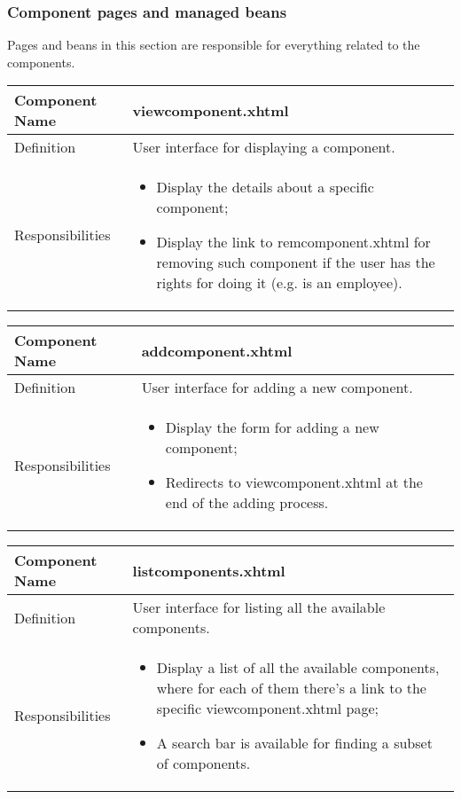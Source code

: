 \documentclass[a4paper,12pt]{book}
\begin{document}
\subsubsection{Component pages and managed beans}
Pages and beans in this section are responsible for everything related to the components.

\begin{center}
  \begin{tabular}{ | p{3.3cm} | p{11.7cm} | }
    \hline
    Component Name & \textbf{viewcomponent.xhtml} \\ \hline
    Definition & User interface for displaying a component. \\ \hline
    Responsibilities & \parbox{0.65\textwidth}{
      \begin{itemize}[noitemsep,leftmargin=*]
        \item Display the details about a specific component;
        \item Display the link to remcomponent.xhtml for removing such component if the user has the rights for doing it (e.g. is an employee).
      \end{itemize}} \\ \hline
    \end{tabular}
  \end{center}
\begin{center}
  \begin{tabular}{ | p{3.3cm} | p{11.7cm} | }
    \hline
    Component Name & \textbf{addcomponent.xhtml} \\ \hline
    Definition & User interface for adding a new component. \\ \hline
    Responsibilities & \parbox{0.65\textwidth}{
      \begin{itemize}[noitemsep,leftmargin=*]
        \item Display the form for adding a new component;
        \item Redirects to viewcomponent.xhtml at the end of the adding process.
      \end{itemize}} \\ \hline
    \end{tabular}
  \end{center}
\begin{center}
  \begin{tabular}{ | p{3.3cm} | p{11.7cm} | }
    \hline
    Component Name & \textbf{listcomponents.xhtml} \\ \hline
    Definition & User interface for listing all the available components. \\ \hline
    Responsibilities & \parbox{0.65\textwidth}{
      \begin{itemize}[noitemsep,leftmargin=*]
        \item Display a list of all the available components, where for each of them there's a link to the specific viewcomponent.xhtml page;
        \item A search bar is available for finding a subset of components.
      \end{itemize}} \\ \hline
    \end{tabular}
  \end{center}
\end{document}
